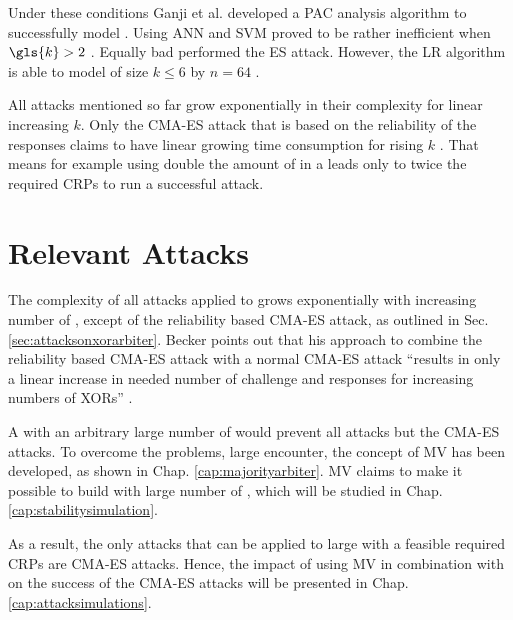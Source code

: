 Under these conditions Ganji et al. developed a \ac{PAC} analysis algorithm to successfully model \xpufs \cite{Ganji2015WhyPUFs}.
Using \ac{ANN} and \ac{SVM} proved to be rather inefficient when $\gls{k} > 2$ \cite{Hospodar2012MachineUsability}.
Equally bad performed the \ac{ES} attack.
However, the \ac{LR} algorithm is able to model \xpufs of size $k \le 6$ by $n = 64$ \cite{Ruhrmair2010ModelingFunctions}.

All attacks mentioned so far grow exponentially in their complexity for linear increasing $k$.
Only the \ac{CMA-ES} attack that is based on the reliability of the responses claims to have linear growing time consumption for rising $k$ \cite{Becker2015ThePUFs}.
That means for example using double the amount of \apufs in a \xpufs leads only to twice the required \acp{CRP} to run a successful attack.


\section{Relevant Attacks}
\label{sec:essentialattacks}

The complexity of all attacks applied to \xpufs grows exponentially with increasing number of \apuf, except of the reliability based \ac{CMA-ES} attack, as outlined in Sec. \ref{sec:attacksonxorarbiter}.
Becker points out that his approach to combine the reliability based \ac{CMA-ES} attack with a normal \ac{CMA-ES} attack ``results in only a linear increase in needed number of challenge and responses for increasing numbers of XORs'' \cite{Becker2015ThePUFs}.

A \xpuf with an arbitrary large number of \apufs would prevent all attacks but the \ac{CMA-ES} attacks.
To overcome the problems, large \xpufs encounter, the concept of \ac{MV} has been developed, as shown in Chap. \ref{cap:majorityarbiter}.
\ac{MV} claims to make it possible to build \xpufs with large number of \apufs, which will be studied in Chap. \ref{cap:stabilitysimulation}.

As a result, the only attacks that can be applied to large \xpufs with a feasible required \acp{CRP} are \ac{CMA-ES} attacks.
Hence, the impact of using \ac{MV} in combination with \apufs on the success of the \ac{CMA-ES} attacks will be presented in Chap. \ref{cap:attacksimulations}.

